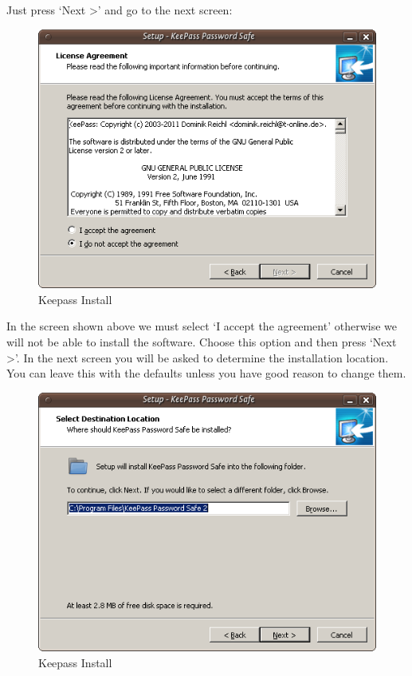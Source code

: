 Just press `Next \textgreater{}' and go to the next screen:

\begin{figure}[htbp]
\centering
\includegraphics{keepass_4.png}
\caption{Keepass Install}
\end{figure}

In the screen shown above we must select `I accept the agreement'
otherwise we will not be able to install the software. Choose this
option and then press `Next \textgreater{}'. In the next screen you will
be asked to determine the installation location. You can leave this with
the defaults unless you have good reason to change them.

\begin{figure}[htbp]
\centering
\includegraphics{keepass_5.png}
\caption{Keepass Install}
\end{figure}

